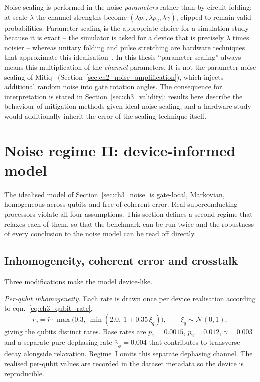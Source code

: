 \documentclass[Thesis.tex]{subfiles}
\begin{document}
Noise scaling is performed in the noise \emph{parameters} rather than by circuit
folding: at scale $\lambda$ the channel strengths become
$(\lambda p_1, \lambda p_2, \lambda \gamma)$, clipped to remain valid probabilities.
Parameter scaling is the appropriate choice for a simulation study because it is
exact -- the simulator is asked for a device that is precisely $\lambda$ times
noisier -- whereas unitary folding and pulse stretching are hardware techniques that
approximate this idealisation~\cite{temme2017error,giurgicatiron2020digital,he2020zero}.
In this thesis ``parameter scaling'' always means this multiplication of the
\emph{channel} parameters. It is not the parameter-noise scaling of
Mitiq~\cite{larose2022mitiq} (Section~\ref{sec:ch2_noise_amplification}), which
injects additional random noise into gate rotation angles. The consequence for interpretation is stated in
Section~\ref{sec:ch3_validity}: results here describe the behaviour of mitigation
methods given ideal noise scaling, and a hardware study would additionally inherit
the error of the scaling technique itself.

\section[Noise regime II: device-informed non-Markovian model]{Noise regime II: device-informed model}
\label{sec:ch3_realistic}

The idealised model of Section~\ref{sec:ch3_noise} is gate-local, Markovian,
homogeneous across qubits and free of coherent error. Real superconducting
processors violate all four assumptions. This section defines a second regime that
relaxes each of them, so that the benchmark can be run twice and the robustness of
every conclusion to the noise model can be read off directly.

\subsection{Inhomogeneity, coherent error and crosstalk}

Three modifications make the model device-like.

\emph{Per-qubit inhomogeneity.} Each rate is drawn once per device realisation
according to eqn.~\eqref{eq:ch3_qubit_rate},
\begin{equation}
  r_q = \bar{r} \cdot \max\bigl(0.3,\ \min(2.0,\ 1 + 0.35\,\xi_q)\bigr),
  \qquad \xi_q \sim \mathcal{N}(0,1),
  \label{eq:ch3_qubit_rate}
\end{equation}
giving the qubits distinct rates. Base rates are
$\bar{p}_1 = 0.0015$, $\bar{p}_2 = 0.012$, $\bar{\gamma} = 0.003$ and a separate
pure-dephasing rate $\bar{\gamma}_\phi = 0.004$ that contributes to transverse
decay alongside relaxation. Regime~I omits this separate dephasing channel. The realised per-qubit values are
recorded in the dataset metadata so the device is reproducible.
\end{document}
